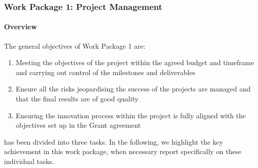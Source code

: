 \subsubsection{Work Package 1: Project Management}


\paragraph{Overview}

The general objectives of Work Package 1 are:

\begin{enumerate}
\item{Meeting the objectives of the project within the agreed budget and timeframe and carrying out control of the milestones and deliverables}
\item{Ensure all the risks jeopardising the success of the projects are managed and that the final results are of good quality}
\item{Ensuring the innovation process within the project is fully aligned with the objectives set up in the Grant agreement}
\end{enumerate}

 has been divided into three tasks. In the
following, we highlight the key achievement in this work package, when
necessary report specifically on these individual tasks.



